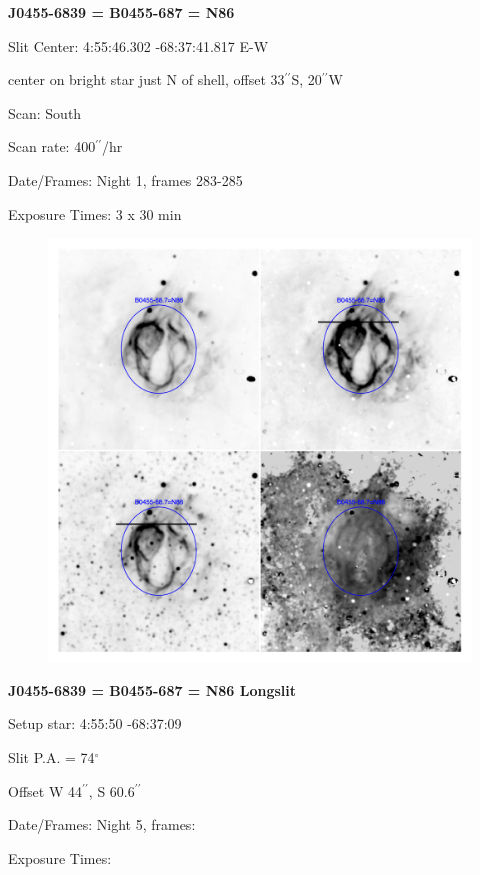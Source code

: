 \documentclass[11pt]{article}
\newcommand{\arcsec}{$^{\prime\prime}$}
\begin{document}
\newpage
{\bf J0455-6839 = B0455-687 = N86}

Slit Center:   4:55:46.302    -68:37:41.817     E-W

center on bright star just N of shell, offset 33\arcsec S, 20\arcsec W

Scan:  South

Scan rate:  400\arcsec/hr

Date/Frames:  Night 1, frames 283-285

Exposure Times:  3 x 30 min

\begin{figure}
\includegraphics[width=11.cm]{snapshots/B0455-687.png}
\end{figure}

\newpage
{\bf J0455-6839 = B0455-687 = N86 Longslit}

Setup star:   4:55:50    -68:37:09     

Slit P.A. = 74$^\circ$

Offset W 44\arcsec,   S  60.6\arcsec 


Date/Frames:  Night 5, frames:

Exposure Times:  
\end{document}

